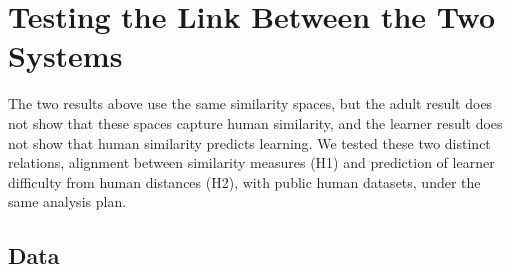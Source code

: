 \documentclass[11pt]{article}
\begin{document}
\begin{table}[!htbp]
\centering\small

\caption{Artificial Learners on CIFAR by Representation}
\label{tab:agents}
\par{}
\end{table}

\section{Testing the Link Between the Two Systems}
\label{sec:link}


The two results above use the same similarity spaces, but the adult result does not show that these spaces capture human similarity, and the learner result does not show that human similarity predicts learning. We tested these two distinct relations, alignment between similarity measures (H1) and prediction of learner difficulty from human distances (H2), with public human datasets, under the same analysis plan.


\subsection{Data}
\end{document}
